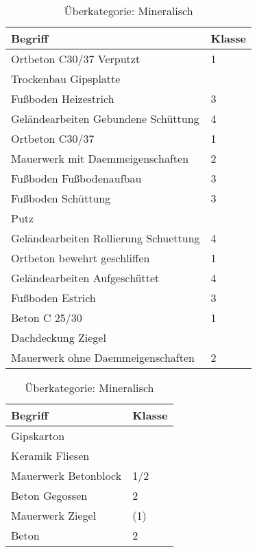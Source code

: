 \begin{table}[h]
	\label{t:evaluation-example1}
	\centering
\begin{tabular}{|p{}|p{}|}
	\hline
	\textbf{Begriff} & \textbf{Klasse} \\ \hline
	Ortbeton C30/37 Verputzt & 1 \\ \hline
	Trockenbau Gipsplatte & ~ \\ \hline
	Fußboden Heizestrich & 3 \\ \hline
	Geländearbeiten Gebundene Schüttung & 4 \\ \hline
	Ortbeton C30/37 & 1 \\ \hline
	Mauerwerk mit Daemmeigenschaften & 2 \\ \hline
	Fußboden Fußbodenaufbau & 3 \\ \hline
	Fußboden Schüttung & 3 \\ \hline
	Putz & ~ \\ \hline
	Geländearbeiten Rollierung Schuettung & 4 \\ \hline
	Ortbeton bewehrt geschliffen & 1 \\ \hline
	Geländearbeiten Aufgeschüttet & 4 \\ \hline
	Fußboden Estrich & 3 \\ \hline
	Beton C 25/30 & 1 \\ \hline
	Dachdeckung Ziegel & ~ \\ \hline
	Mauerwerk ohne Daemmeigenschaften & 2 \\ \hline
	\end{tabular}
	\caption{Überkategorie: Mineralisch}
\end{table}

\begin{table}[h]
	\label{t:evaluation-example2}
	\centering
	\begin{tabular}{|p{}|p{}|}
		\hline
		\textbf{Begriff} & \textbf{Klasse} \\ \hline
		Gipskarton & ~ \\ \hline
		Keramik Fliesen & ~ \\ \hline
		Mauerwerk Betonblock & 1/2 \\ \hline
		Beton Gegossen & 2 \\ \hline
		Mauerwerk Ziegel & (1) \\ \hline
		Beton & 2 \\ \hline
	\end{tabular}
	\caption[]{Überkategorie: Mineralisch}
\end{table}

